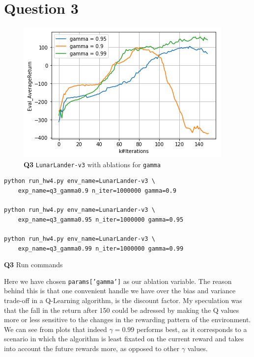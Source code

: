 \documentclass[11pt]{article}
\begin{document}
\section{Question 3}
\label{sec:org795c529}
\begin{figure}[htbp]
\centering
\includegraphics[width=.9\linewidth]{./3.png}
\caption{\textbf{Q3} \texttt{LunarLander-v3} with ablations for \texttt{gamma}}
\end{figure}

\begin{listing}[htbp]
\begin{verbatim}
python run_hw4.py env_name=LunarLander-v3 \
    exp_name=q3_gamma0.9 n_iter=1000000 gamma=0.9

python run_hw4.py env_name=LunarLander-v3 \
    exp_name=q3_gamma0.95 n_iter=1000000 gamma=0.95

python run_hw4.py env_name=LunarLander-v3 \
    exp_name=q3_gamma0.99 n_iter=1000000 gamma=0.99
\end{verbatim}
\caption{\textbf{Q3} Run commands}
\end{listing}

Here we have chosen \texttt{params['gamma']} as our ablation variable. The reason behind this is that one convenient handle we have over the bias and variance trade-off in a Q-Learning algorithm, is the discount factor. My speculation was that the fall in the return after 150 could be adressed by making the Q values more or less sensitive to the changes in the rewarding pattern of the environment. We can see from plots that indeed \(\gamma=0.99\) performs best, as it corresponds to a scenario in which the algorithm is least fixated on the current reward and takes into account the future rewards more, as opposed to other \(\gamma\) values.
\end{document}
